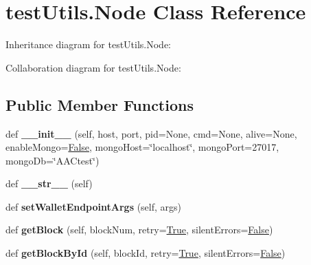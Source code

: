 \hypertarget{classtest_utils_1_1_node}{}\section{test\+Utils.\+Node Class Reference}
\label{classtest_utils_1_1_node}


Inheritance diagram for test\+Utils.\+Node\+:


Collaboration diagram for test\+Utils.\+Node\+:
\subsection*{Public Member Functions}
\begin{DoxyCompactItemize}
\item 
\mbox{\label{classtest_utils_1_1_node_a8ee5819bec00d40cfa6d1bb34bb4186d}} 
def {\bfseries \+\_\+\+\_\+init\+\_\+\+\_\+} (self, host, port, pid=None, cmd=None, alive=None, enable\+Mongo=\mbox{\hyperlink{struct_false}{False}}, mongo\+Host=\char`\"{}localhost\char`\"{}, mongo\+Port=27017, mongo\+Db=\char`\"{}A\+A\+Ctest\char`\"{})
\item 
\mbox{\label{classtest_utils_1_1_node_a131fd94a5a3e1e628ed14cff8f19ed59}} 
def {\bfseries \+\_\+\+\_\+str\+\_\+\+\_\+} (self)
\item 
\mbox{\label{classtest_utils_1_1_node_a5f8f214e10db02d05ea196fbcdf99be4}} 
def {\bfseries set\+Wallet\+Endpoint\+Args} (self, args)
\item 
\mbox{\label{classtest_utils_1_1_node_a6ba40d66517e66bd8e280d787e0d7c4d}} 
def {\bfseries get\+Block} (self, block\+Num, retry=\mbox{\hyperlink{struct_true}{True}}, silent\+Errors=\mbox{\hyperlink{struct_false}{False}})
\item 
\mbox{\label{classtest_utils_1_1_node_aadb8d902f69390bf623663de909285c7}} 
def {\bfseries get\+Block\+By\+Id} (self, block\+Id, retry=\mbox{\hyperlink{struct_true}{True}}, silent\+Errors=\mbox{\hyperlink{struct_false}{False}})
\item 
\mbox{\label{classtest_utils_1_1_node_af6e9050aa60387e64284731144e4bfa8}} 

\end{DoxyCompactItemize}

